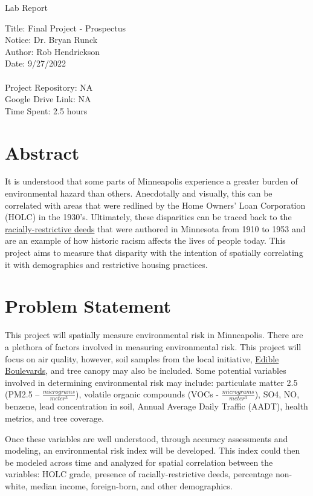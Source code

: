 \documentclass[article,12pt]{article}
\numberwithin{equation}{section}
\begin{document}
\begin{center}
Lab Report

Title: Final Project - Prospectus\\
Notice: Dr. Bryan Runck\\
Author: Rob Hendrickson\\
Date: 9/27/2022\\~\\

Project Repository: NA\\
Google Drive Link: NA\\
Time Spent: 2.5 hours

\end{center}

\section*{Abstract}
It is understood that some parts of Minneapolis experience a greater burden of environmental hazard than others. Anecdotally and visually, this can be correlated with areas that were redlined by the Home Owners’ Loan Corporation (HOLC) in the 1930’s. Ultimately, these disparities can be traced back to the \href{https://pressbooks.umn.edu/mappingprejudicecurriculum/chapter/what-is-a-racial-covenant/}{racially-restrictive deeds} that were authored in Minnesota from 1910 to 1953 and are an example of how historic racism affects the lives of people today. This project aims to measure that disparity with the intention of spatially correlating it with demographics and restrictive housing practices.


\section*{Problem Statement}
This project will spatially measure environmental risk in Minneapolis. There are a plethora of factors involved in measuring environmental risk. This project will focus on air quality, however, soil samples from the local initiative, \href{https://www.facebook.com/groups/425283655203308/}{Edible Boulevards}, and tree canopy may also be included. Some potential variables involved in determining environmental risk may include: particulate matter 2.5 (PM2.5 – $\frac{micrograms}{meter^3}$), volatile organic compounds (VOCs - $\frac{micrograms}{meter^3}$), SO4, NO, benzene, lead concentration in soil, Annual Average Daily Traffic (AADT), health metrics, and tree coverage. 

Once these variables are well understood, through accuracy assessments and modeling, an environmental risk index will be developed. This index could then be modeled across time and analyzed for spatial correlation between the variables: HOLC grade, presence of racially-restrictive deeds, percentage non-white, median income, foreign-born, and other demographics.
\end{document}
